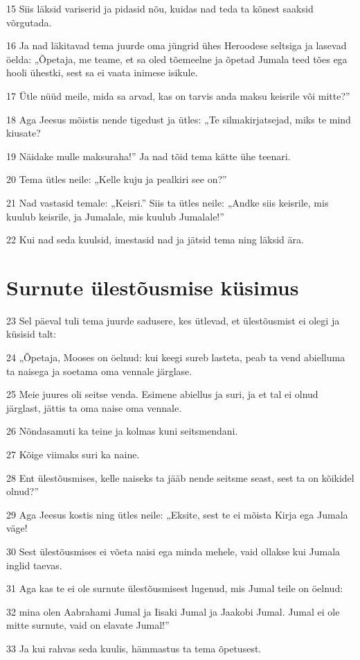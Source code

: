 \par 15 Siis läksid variserid ja pidasid nõu, kuidas nad teda ta kõnest saaksid võrgutada.
\par 16 Ja nad läkitavad tema juurde oma jüngrid ühes Heroodese seltsiga ja lasevad öelda: „Õpetaja, me teame, et sa oled tõemeelne ja õpetad Jumala teed tões ega hooli ühestki, sest sa ei vaata inimese isikule.
\par 17 Ütle nüüd meile, mida sa arvad, kas on tarvis anda maksu keisrile või mitte?”
\par 18 Aga Jeesus mõistis nende tigedust ja ütles: „Te silmakirjatsejad, miks te mind kiusate?
\par 19 Näidake mulle maksuraha!” Ja nad tõid tema kätte ühe teenari.
\par 20 Tema ütles neile: „Kelle kuju ja pealkiri see on?”
\par 21 Nad vastasid temale: „Keisri.” Siis ta ütles neile: „Andke siis keisrile, mis kuulub keisrile, ja Jumalale, mis kuulub Jumalale!”
\par 22 Kui nad seda kuulsid, imestasid nad ja jätsid tema ning läksid ära.

\section*{Surnute ülestõusmise küsimus}

\par 23 Sel päeval tuli tema juurde sadusere, kes ütlevad, et ülestõusmist ei olegi ja küsisid talt:
\par 24 „Õpetaja, Mooses on öelnud: kui keegi sureb lasteta, peab ta vend abielluma ta naisega ja soetama oma vennale järglase.
\par 25 Meie juures oli seitse venda. Esimene abiellus ja suri, ja et tal ei olnud järglast, jättis ta oma naise oma vennale.
\par 26 Nõndasamuti ka teine ja kolmas kuni seitsmendani.
\par 27 Kõige viimaks suri ka naine.
\par 28 Ent ülestõusmises, kelle naiseks ta jääb nende seitsme seast, sest ta on kõikidel olnud?”
\par 29 Aga Jeesus kostis ning ütles neile: „Eksite, sest te ei mõista Kirja ega Jumala väge!
\par 30 Sest ülestõusmises ei võeta naisi ega minda mehele, vaid ollakse kui Jumala inglid taevas.
\par 31 Aga kas te ei ole surnute ülestõusmisest lugenud, mis Jumal teile on öelnud:
\par 32 mina olen Aabrahami Jumal ja Iisaki Jumal ja Jaakobi Jumal. Jumal ei ole mitte surnute, vaid on elavate Jumal!”
\par 33 Ja kui rahvas seda kuulis, hämmastus ta tema õpetusest.


